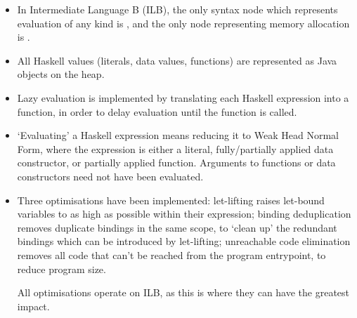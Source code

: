 \documentclass[dissertation.tex]{subfiles}
\begin{document}
{\begin{itemize}
{    }
    \item
    {

        In Intermediate Language B (ILB), the only syntax node which represents evaluation of any kind is
        , and the only node representing memory allocation is .

    }
    \item All Haskell values (literals, data values, functions) are represented as Java objects on the heap.
    \item
    {

        Lazy evaluation is implemented by translating each Haskell expression into a function, in order to delay
        evaluation until the function is called.

    }
    \item
    {

        `Evaluating' a Haskell expression means reducing it to Weak Head Normal Form, where the expression is either a
        literal, fully/partially applied data constructor, or partially applied function. Arguments to functions or data
        constructors need not have been evaluated.

    }
    \item
    {

        Three optimisations have been implemented: let-lifting raises let-bound variables to as high as possible within
        their expression; binding deduplication removes duplicate bindings in the same scope, to `clean up' the
        redundant bindings which can be introduced by let-lifting; unreachable code elimination removes all code that
        can't be reached from the program entrypoint, to reduce program size.

        All optimisations operate on ILB, as this is where they can have the greatest impact.

    }
    \end{itemize}

}
\end{document}
